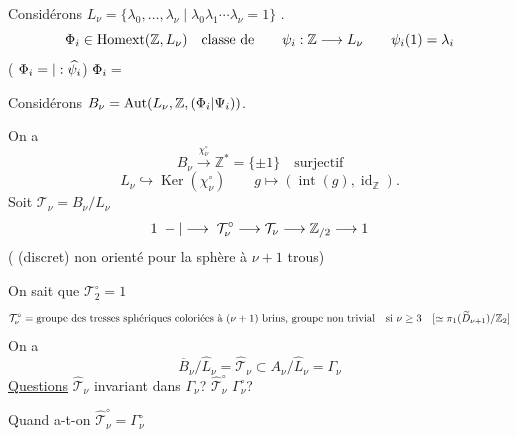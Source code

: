 Considérons $L_\nu=\{\lambda_0,\ldots,\lambda_\nu\mid\lambda_0\lambda_1\cdots\lambda_\nu=1\}$ .
\[
\Phi_i\in\operatorname{Homext}(\mathbb Z,L_\nu)\quad\text{classe de}
\qquad\psi_i:\mathbb Z\longrightarrow L_\nu\qquad\psi_i(1)=\lambda_i
\]
( $\Phi_i=|:\widehat{\psi_i}$) $\Phi_i=$

Considérons $B_\nu=\operatorname{Aut}(L_\nu,\mathbb Z,(\Phi_i|\Psi_i))$.

On a
\[
B_\nu\xrightarrow{\chi_\nu^\circ}\mathbb Z^*=\{\pm1\}\quad\text{surjectif}
\]
\[
L_\nu\hookrightarrow\operatorname{Ker}(\chi_\nu^\circ)\qquad g\longmapsto(\operatorname{int}(g),\operatorname{id}_{\mathbb Z}).
\]
Soit $\mathcal T_\nu=B_\nu/L_\nu$
\[
1\;-|\longrightarrow\;\mathcal T_\nu^\circ\longrightarrow\mathcal T_\nu\longrightarrow\mathbb Z_{/2}\longrightarrow1
\]
( (discret) non orienté pour la sphère à $\nu+1$ trous)

On sait que $\mathcal T_2^\circ=1$
\[
\mathcal T_\nu^\circ=\text{groupe des tresses sphériques coloriées à $(\nu+1)$ brins, groupe non trivial}
\quad\text{si }\nu\geq3\quad
[\simeq\pi_1(\widetilde D_{\nu+1})/\mathbb Z_2]
\]
On a
\[
\overline B_\nu/\widehat L_\nu=\widehat{\mathcal T}_\nu\subset A_\nu/\widehat L_\nu=\Gamma_\nu
\]
\uline{Questions} $\widehat{\mathcal T}_\nu$ invariant dans $\Gamma_\nu$? $\widehat{\mathcal T}_\nu^\circ$  $\Gamma_\nu^\circ$?

Quand a-t-on  $\widehat{\mathcal T}_\nu^\circ=\Gamma_\nu^\circ$

